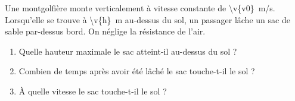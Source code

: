 Une montgolfière monte verticalement à vitesse constante de \qty{\v{v0}}{m/s}. Lorsqu'elle se trouve à \qty{\v{h}}{m} au-dessus du sol, un passager lâche un sac de sable par-dessus bord. On néglige la résistance de l'air.

\begin{enumerate}[label=\alph*)]
    \item Quelle hauteur maximale le sac atteint-il au-dessus du sol ?
    \item Combien de temps après avoir été lâché le sac touche-t-il le sol ?
    \item À quelle vitesse le sac touche-t-il le sol ?
\end{enumerate}
